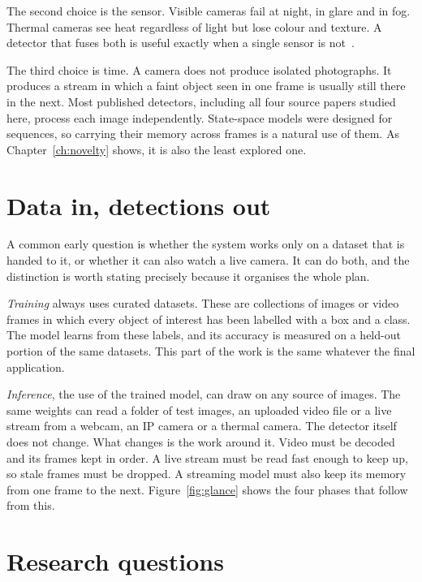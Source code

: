 The second choice is the sensor. Visible cameras fail at night, in glare
and in fog. Thermal cameras see heat regardless of light but lose colour
and texture. A detector that fuses both is useful exactly when a single
sensor is not~\citep{li2025cfmw,dong2025fusionmamba}.

The third choice is time. A camera does not produce isolated photographs.
It produces a stream in which a faint object seen in one frame is usually
still there in the next. Most published detectors, including all four
source papers studied here, process each image independently. State-space
models were designed for sequences, so carrying their memory across frames
is a natural use of them. As Chapter~\ref{ch:novelty} shows, it is also the
least explored one.

\section{Data in, detections out}
\label{sec:datain}

A common early question is whether the system works only on a dataset that is
handed to it, or whether it can also watch a live camera. It can do both,
and the distinction is worth stating precisely because it organises the
whole plan.

\emph{Training} always uses curated datasets. These are collections of images
or video frames in which every object of interest has been labelled with a
box and a class. The model learns from these labels, and its accuracy is
measured on a held-out portion of the same datasets. This part of the work is
the same whatever the final application.

\emph{Inference}, the use of the trained model, can draw on any source of
images. The same weights can read a folder of test images, an uploaded video
file or a live stream from a webcam, an IP camera or a thermal camera. The
detector itself does not change. What changes is the work around it. Video
must be decoded and its frames kept in order. A live stream must be read
fast enough to keep up, so stale frames must be dropped. A streaming model
must also keep its memory from one frame to the next.
Figure~\ref{fig:glance} shows the four phases that follow from this.



\section{Research questions}

